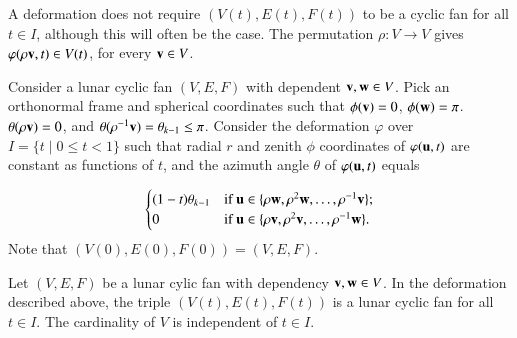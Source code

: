 A deformation does not require $(V(t),E(t),F(t))$ to be a cyclic fan for all $t\in I$, although this will often be the case. The permutation $\rho:V\to V$ gives $\varphi(\rho {\mathbf v},t)\in V(t)$, for every ${\mathbf v}\in V$.  


\begin{example}\label{example:lunar}
Consider a lunar cyclic fan $(V,E,F)$ with dependent ${\mathbf v},{\mathbf w}\in V$.   Pick an orthonormal frame and spherical coordinates such that $\phi({\mathbf v})=0$, $\phi({\mathbf w})=\pi$.  $\theta(\rho {\mathbf v})=0$, and $\theta(\rho^{-1} {\mathbf v})=\theta_{k-1}\le\pi$.  Consider the deformation $\varphi$ over 
$I = \{t \mid 0 \le t < 1\}$
such that radial $r$ and zenith $\phi$ coordinates of $\varphi({\mathbf u},t)$ are constant as functions of $t$,
and the azimuth angle $\theta$ of $\varphi({\mathbf u},t)$ equals

$$
\begin{cases} 
   (1-t) \theta_{k-1} & \text{if } {\mathbf u}\in \{\rho {\mathbf w},\rho^2 {\mathbf w},\ldots, \rho^{-1} {\mathbf v}\};\\
   0 & \text{if } {\mathbf u}\in \{\rho {\mathbf v},\rho^2 {\mathbf v},\ldots,\rho^{-1} {\mathbf w}\}.\\
\end{cases}
$$
Note that $(V(0),E(0),F(0)) = (V,E,F)$.
\end{example}
%
%

\begin{lemma}\label{lemma:lunar-deform} 
Let $(V,E,F)$ be a lunar cylic fan with dependency ${\mathbf v},{\mathbf w}\in V$.  In the deformation described above, the triple $(V(t),E(t),F(t))$ is a lunar cyclic fan for all $t\in I$.  The cardinality of $V$ is independent of $t\in I$.
\end{lemma}

